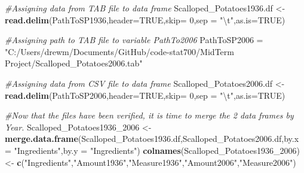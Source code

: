 \documentclass[]{article}
\newenvironment{Shaded}{\begin{snugshade}}{\end{snugshade}}
\newcommand{\KeywordTok}[1]{\textcolor[rgb]{0.13,0.29,0.53}{\textbf{#1}}}
\newcommand{\DataTypeTok}[1]{\textcolor[rgb]{0.13,0.29,0.53}{#1}}
\newcommand{\DecValTok}[1]{\textcolor[rgb]{0.00,0.00,0.81}{#1}}
\newcommand{\CharTok}[1]{\textcolor[rgb]{0.31,0.60,0.02}{#1}}
\newcommand{\StringTok}[1]{\textcolor[rgb]{0.31,0.60,0.02}{#1}}
\newcommand{\CommentTok}[1]{\textcolor[rgb]{0.56,0.35,0.01}{\textit{#1}}}
\newcommand{\OtherTok}[1]{\textcolor[rgb]{0.56,0.35,0.01}{#1}}
\newcommand{\OperatorTok}[1]{\textcolor[rgb]{0.81,0.36,0.00}{\textbf{#1}}}
\newcommand{\NormalTok}[1]{#1}
\begin{document}
\begin{Shaded}
\begin{Highlighting}[]
\CommentTok{#Assigning data from TAB file to data frame}
\NormalTok{Scalloped_Potatoes1936.df <-}\StringTok{ }\KeywordTok{read.delim}\NormalTok{(PathToSP1936,}\DataTypeTok{header=}\OtherTok{TRUE}\NormalTok{,}\DataTypeTok{skip=} \DecValTok{0}\NormalTok{,}\DataTypeTok{sep =} \StringTok{"}\CharTok{\textbackslash{}t}\StringTok{"}\NormalTok{,}\DataTypeTok{as.is=}\OtherTok{TRUE}\NormalTok{)}

\CommentTok{#Assigning path to TAB file to variable PathTo2006}
\NormalTok{PathToSP2006 =}\StringTok{ "C:/Users/drewm/Documents/GitHub/code-stat700/MidTerm Project/Scalloped_Potatoes2006.tab"}

\CommentTok{#Assigning data from CSV file to data frame}
\NormalTok{Scalloped_Potatoes2006.df <-}\StringTok{ }\KeywordTok{read.delim}\NormalTok{(PathToSP2006,}\DataTypeTok{header=}\OtherTok{TRUE}\NormalTok{,}\DataTypeTok{skip=} \DecValTok{0}\NormalTok{,}\DataTypeTok{sep =} \StringTok{"}\CharTok{\textbackslash{}t}\StringTok{"}\NormalTok{,}\DataTypeTok{as.is=}\OtherTok{TRUE}\NormalTok{)}

\CommentTok{#Now that the files have been verified, it is time to merge the 2 data frames by Year.}
\NormalTok{Scalloped_Potatoes1936_}\DecValTok{2006}\NormalTok{ <-}\StringTok{ }\KeywordTok{merge.data.frame}\NormalTok{(Scalloped_Potatoes1936.df,Scalloped_Potatoes2006.df,}\DataTypeTok{by.x =} \StringTok{"Ingredients"}\NormalTok{,}\DataTypeTok{by.y =} \StringTok{"Ingredients"}\NormalTok{)}
\KeywordTok{colnames}\NormalTok{(Scalloped_Potatoes1936_}\DecValTok{2006}\NormalTok{) <-}\StringTok{ }\KeywordTok{c}\NormalTok{(}\StringTok{"Ingredients"}\NormalTok{,}\StringTok{"Amount1936"}\NormalTok{,}\StringTok{"Measure1936"}\NormalTok{,}\StringTok{"Amount2006"}\NormalTok{,}\StringTok{"Measure2006"}\NormalTok{)}
\end{Highlighting}
\end{Shaded}

\begin{Shaded}
\end{Shaded}
\end{document}
